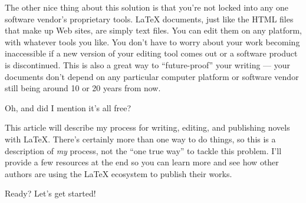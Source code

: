 The other nice thing about this solution is that you're not locked into any
one software vendor's proprietary tools. \LaTeX{} documents, just like the HTML
files that make up Web sites, are simply text files. You can edit them on any
platform, with whatever tools you like. You don't have to worry about your
work becoming inaccessible if a new version of your editing tool comes out or
a software product is discontinued. This is also a great way to
``future-proof'' your writing --- your documents don't depend on any
particular computer platform or software vendor still being around 10 or 20
years from now.

Oh, and did I mention it's all free?

This article will describe my process for writing, editing, and publishing
novels with \LaTeX. There's certainly more than one way to do things, so this
is a description of \emph{my} process, not the ``one true way'' to tackle this
problem. I'll provide a few resources at the end so you can learn more and see
how other authors are using the \LaTeX{} ecosystem to publish their works.

Ready? Let's get started!

